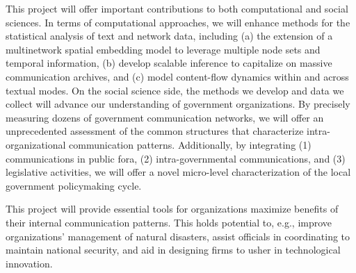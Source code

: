 
 This project will offer important contributions to both computational and social sciences. In terms of computational approaches, we will enhance methods for the statistical analysis of text and network data, including (a) the extension of a multinetwork spatial embedding model to leverage multiple node sets and temporal information, (b) develop scalable inference to capitalize on massive communication archives, and (c) model content-flow dynamics within and across textual modes.  On the social science side, the methods we develop and data we collect will advance our understanding of government organizations. By precisely measuring dozens of government communication networks, we will offer an unprecedented assessment of the common structures that characterize intra-organizational communication patterns. Additionally, by integrating (1) communications in public fora, (2) intra-governmental communications, and (3) legislative activities, we will offer a novel micro-level characterization of the local government policymaking cycle. \vspace{.05cm}


 This project will provide essential tools for organizations maximize benefits of their internal communication patterns. This holds potential to, e.g., improve organizations' management of natural disasters, assist officials in coordinating to maintain national security, and aid in designing firms to usher in technological innovation.




